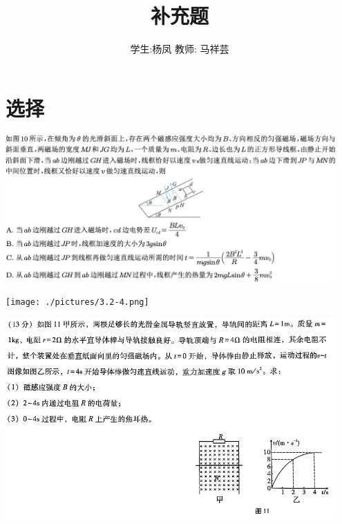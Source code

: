 \documentclass{article}
\title{补充题}
\author{学生:杨凤 \quad 教师: 马祥芸}
\begin{document}
\maketitle
\tableofcontents
\newpage

\section{选择}

\includegraphics[width=0.95\textwidth,keepaspectratio]{./pictures/3.2-3.png}

\vspace{2em}

\texttt{[image: ./pictures/3.2-4.png]}

\vspace{2em}

\includegraphics[width=0.95\textwidth,keepaspectratio]{./pictures/1.png}
\end{document}
